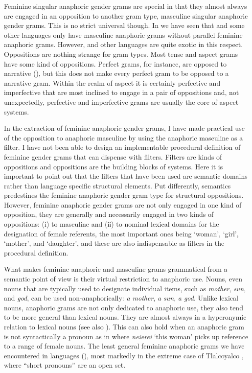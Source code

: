 \documentclass[output=collectionpaper]{langsci/langscibook}
\begin{document}
Feminine singular anaphoric gender grams are special in that they almost always are engaged in an opposition to another gram type, masculine singular anaphoric gender grams. This is no strict universal though. In  we have seen that  and some other  languages only have masculine anaphoric grams without parallel feminine anaphoric grams. However,  and other  languages are quite exotic in this respect. Oppositions are nothing strange for gram types. Most tense and aspect grams have some kind of oppositions. Perfect grams, for instance, are opposed to narrative (\citealt[327]{Dahl2016}), but this does not make every perfect gram to be opposed to a narrative gram. Within the realm of aspect it is certainly perfective and imperfective that are most inclined to engage in a pair of oppositions and, not unexpectedly, perfective and imperfective grams are usually the core of aspect systems.

In the extraction of feminine anaphoric gender grams, I have made practical use of the opposition to anaphoric masculine by using the anaphoric masculine as a filter. I have not been able to design an implementable procedural definition of feminine gender grams that can dispense with filters. Filters are kinds of oppositions and oppositions are the building blocks of systems. Here it is important to point out that the filters that have been used are semantic domains rather than language specific structural elements. Put differently, semantics predestines the feminine anaphoric gender gram type for structural oppositions. However, feminine anaphoric gender grams are not only engaged in one kind of opposition, they are generally and necessarily engaged in two kinds of oppositions: (i) to masculine and (ii) to nominal lexical domains for the designation of female referents, the most important ones being ‘woman’, ‘girl’, ‘mother’, and ‘daughter’, and these are also indispensable as filters in the procedural definition.

What makes feminine anaphoric and masculine grams grammatical from a semantic point of view is their virtual restriction to anaphoric use. Nouns, even nouns that are typically used to designate individual items, such as \textit{mother}, \textit{sun}, and \textit{god}, can be used non-anaphorically: \textit{a mother}, \textit{a sun}, \textit{a god}. Unlike lexical nouns, anaphoric grams are not only dedicated to anaphoric use, they also tend to be more general than lexical nouns. They are almost always in a hyperonymic relation to lexical nouns (see also \citealt{Seifart2018}). This can also hold when an anaphoric gram is not syntactically a pronoun as in  where \textit{neierei} ‘this woman’ picks up reference to a range of female nouns. The least general feminine anaphoric grams we have encountered in  languages (), most markedly in the extreme case of Tlalcoyalco , where “short pronouns” are an open set.
\end{document}
